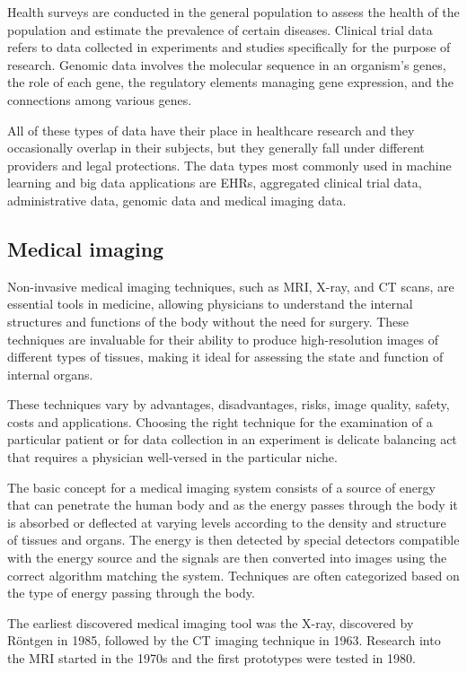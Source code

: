	Health surveys are conducted in the general population to assess the health of the population and estimate the prevalence of certain diseases. Clinical trial data refers to data collected in experiments and studies specifically for the purpose of research. Genomic data involves the molecular sequence in an organism’s genes, the role of each gene, the regulatory elements managing gene expression, and the connections among various genes.
	
	All of these types of data have their place in healthcare research and they occasionally overlap in their subjects, but they generally fall under different providers and legal protections. The data types most commonly used in machine learning and big data applications are EHRs, aggregated clinical trial data, administrative data, genomic data\cite{mostert2016big} and medical imaging data\cite{suzuki2017overview}.
	

	\subsection{Medical imaging}
	
	Non-invasive medical imaging techniques, such as MRI, X-ray, and CT scans, are essential tools in medicine, allowing physicians to understand the internal structures and functions of the body without the need for surgery. These techniques are invaluable for their ability to produce high-resolution images of different types of tissues, making it ideal for assessing the state and function of internal organs\cite{kasban2015comparative}.
	
	These techniques vary by advantages, disadvantages, risks, image quality, safety, costs and applications. Choosing the right technique for the examination of a particular patient or for data collection in an experiment is delicate balancing act that requires a physician well-versed in the particular niche.
	
	The basic concept for a medical imaging system consists of a source of energy that can penetrate the human body and as the energy passes through the body it is absorbed or deflected at varying levels according to the density and structure of tissues and organs. The energy is then detected by special detectors compatible with the energy source and the signals are then converted into images using the correct algorithm matching the system. Techniques are often categorized based on the type of energy passing through the body.
	
	The earliest discovered medical imaging tool was the X-ray, discovered by Röntgen in 1985, followed by the CT imaging technique in 1963. Research into the MRI started in the 1970s and the first prototypes were tested in 1980.
	
